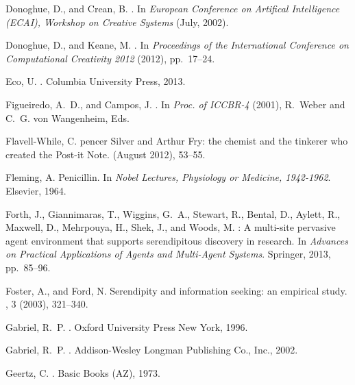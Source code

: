 \begin{thebibliography}{10}
{\sc Donoghue, D., and Crean, B.}
.
\newblock In {\em European Conference on Artifical Intelligence (ECAI),
  Workshop on Creative Systems\/} (July, 2002).

{\sc Donoghue, D., and Keane, M.}
.
\newblock In {\em Proceedings of the International Conference on Computational
  Creativity 2012\/} (2012), pp.~17--24.

{\sc Eco, U.}
.
\newblock Columbia University Press, 2013.

{\sc Figueiredo, A.~D., and Campos, J.}
.
\newblock In {\em Proc. of ICCBR-4\/} (2001), R.~Weber and C.~G. von
  Wangenheim, Eds.

{\sc Flavell-While, C.}
pencer {S}ilver and {A}rthur {F}ry: the chemist and the tinkerer
  who created the {P}ost-it {N}ote.
 (August 2012), 53--55.

{\sc Fleming, A.}
\newblock Penicillin.
\newblock In {\em Nobel Lectures, Physiology or Medicine, 1942-1962}. Elsevier,
  1964.

{\sc Forth, J., Giannimaras, T., Wiggins, G.~A., Stewart, R., Bental, D.,
  Aylett, R., Maxwell, D., Mehrpouya, H., Shek, J., and Woods, M.}
: A multi-site pervasive agent environment that supports
  serendipitous discovery in research.
\newblock In {\em Advances on Practical Applications of Agents and Multi-Agent
  Systems}. Springer, 2013, pp.~85--96.

{\sc Foster, A., and Ford, N.}
\newblock Serendipity and information seeking: an empirical study.
, 3 (2003), 321--340.

{\sc Gabriel, R.~P.}
.
\newblock Oxford University Press New York, 1996.

{\sc Gabriel, R.~P.}
.
\newblock Addison-Wesley Longman Publishing Co., Inc., 2002.

{\sc Geertz, C.}
.
\newblock Basic Books (AZ), 1973.


\end{thebibliography}
